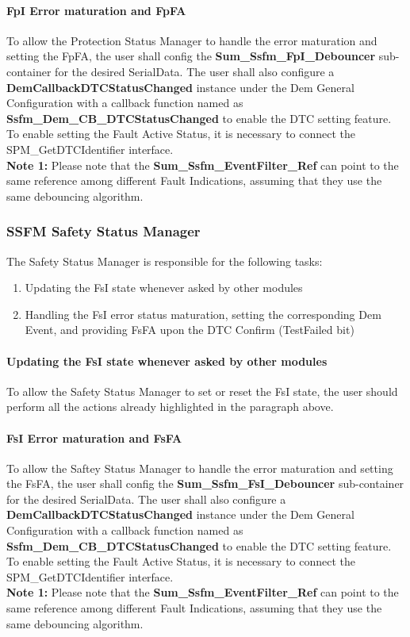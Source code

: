 \paragraph{FpI Error maturation and FpFA}
To allow the Protection Status Manager to handle the error maturation and setting the FpFA, the user shall config the \textbf{Sum\_Ssfm\_FpI\_Debouncer} sub-container for the desired SerialData.
The user shall also configure a \textbf{DemCallbackDTCStatusChanged} instance under the Dem General Configuration 
with a callback function named as \textbf{Ssfm\_Dem\_CB\_DTCStatusChanged} to enable the DTC setting feature.
To enable setting the Fault Active Status, it is necessary to connect the SPM\_GetDTCIdentifier interface.
\\\textbf{Note 1:} Please note that the \textbf{Sum\_Ssfm\_EventFilter\_Ref} can point to the same reference among different Fault Indications, assuming that they use the same debouncing algorithm. 

\subsubsection{SSFM Safety Status Manager}
\label{subsec:safetystatusmanager}

The Safety Status Manager is responsible for the following tasks:

\begin{enumerate}
\item Updating the FsI state whenever asked by other modules
\item Handling the FsI error status maturation, setting the corresponding Dem Event, and providing FsFA upon the DTC Confirm (TestFailed bit)
\end{enumerate}

\paragraph{Updating the FsI state whenever asked by other modules}
To allow the Safety Status Manager to set or reset the FsI state, the user should perform all the actions already highlighted in the paragraph above.

\paragraph{FsI Error maturation and FsFA}
To allow the Saftey Status Manager to handle the error maturation and setting the FsFA, the user shall config the \textbf{Sum\_Ssfm\_FsI\_Debouncer} sub-container for the desired SerialData.
The user shall also configure a \textbf{DemCallbackDTCStatusChanged} instance under the Dem General Configuration 
with a callback function named as \textbf{Ssfm\_Dem\_CB\_DTCStatusChanged} to enable the DTC setting feature.
To enable setting the Fault Active Status, it is necessary to connect the SPM\_GetDTCIdentifier interface.
\\\textbf{Note 1:} Please note that the \textbf{Sum\_Ssfm\_EventFilter\_Ref} can point to the same reference among different Fault Indications, assuming that they use the same debouncing algorithm. 

